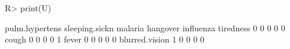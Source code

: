 \begin{Schunk}
% --begin: "comp.u"
\begin{Sinput}
R> print(U)
\end{Sinput}
\begin{Soutput}
               pulm.hypertens sleeping.sickn malaria hangover influenza
tiredness                   0              0       0        0         0
cough                       0              0       0        0         1
fever                       0              0       0        0         0
blurred.vision              1              0       0        0         0
\end{Soutput}
%
% --end: "comp.u"
\end{Schunk}
